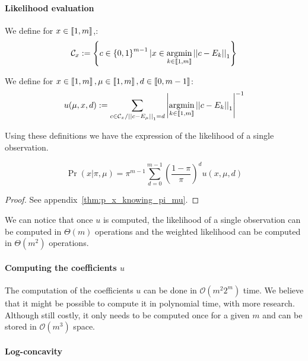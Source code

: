 \paragraph{Likelihood evaluation}

\begin{definition}
    We define for $x \in \left\llbracket1, m\right\rrbracket$,:
\[ \mathcal{C}_x := \left\{ c \in \left\{ 0, 1 \right\}^{m-1} | x \in \operatorname*{argmin}_{k \in \left\llbracket1, m\right\rrbracket} \left|\left|c - E_k\right|\right|_1  \right\}\]
\end{definition}

\begin{definition}
    We define for $x \in \left\llbracket1, m\right\rrbracket, \mu \in \left\llbracket1, m\right\rrbracket, d \in \left\llbracket0, m-1\right\rrbracket$:
    \[ u(\mu, x, d) := \sum_{c \in \mathcal{C}_x / \left|\left|c - E_{\mu}\right|\right|_1 = d}  \left|\operatorname*{argmin}_{k \in \left\llbracket1, m\right\rrbracket} \left|\left|c - E_k\right|\right|_1\right|^{-1}\]
\end{definition}

Using these definitions we have the expression of the likelihood of a single observation.

\begin{thm}
    \label{thm:p_x_knowing_pi_mu}
    \[\Pr(x | \pi, \mu) = \pi^{m-1} \sum_{d = 0}^{m-1} \left(\frac{1 - \pi}{\pi}\right)^d u(x, \mu, d)\]
\end{thm}
\begin{proof}
    See appendix~\ref{thm:p_x_knowing_pi_mu}.
\end{proof}

We can notice that once $u$ is computed, the likelihood of a single observation can be computed in $\Theta(m)$ operations and the weighted likelihood can be computed in $\Theta(m^2)$ operations. 

\paragraph{Computing the coefficients $u$}

The computation of the coefficients $u$ can be done in $\mathcal O(m^2 2^m)$ time. We believe that it might be possible to compute it in polynomial time, with more research. Although still costly, it only needs to be computed once for a given $m$ and can be stored in $\mathcal O(m^3)$ space.

\paragraph{Log-concavity}

